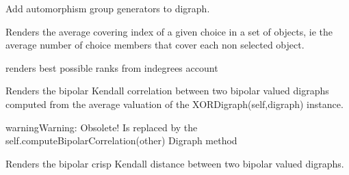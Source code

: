 \documentclass[letterpaper,10pt,english]{sphinxmanual}
\begin{document}
\begin{fulllineitems}
\begin{fulllineitems}
\end{fulllineitems}


\begin{fulllineitems}
\label{techDoc:digraphs.Digraph.automorphismGenerators}
Add automorphism group generators to digraph.

\end{fulllineitems}


\begin{fulllineitems}
\label{techDoc:digraphs.Digraph.averageCoveringIndex}
Renders the average covering index of a given choice in a set of objects,
ie the average number of choice members that cover each
non selected object.

\end{fulllineitems}


\begin{fulllineitems}
\label{techDoc:digraphs.Digraph.bestRanks}
renders best possible ranks from indegrees account

\end{fulllineitems}


\begin{fulllineitems}
\label{techDoc:digraphs.Digraph.bipolarKCorrelation}
Renders the bipolar Kendall correlation between two bipolar valued
digraphs computed from the average valuation of the
XORDigraph(self,digraph) instance.

\begin{notice}{warning}{Warning:}
Obsolete! Is replaced by the self.computeBipolarCorrelation(other) Digraph method
\end{notice}

\end{fulllineitems}


\begin{fulllineitems}
\label{techDoc:digraphs.Digraph.bipolarKDistance}
Renders the bipolar crisp Kendall distance between two bipolar valued
digraphs.


\end{fulllineitems}
\end{fulllineitems}
\end{document}
